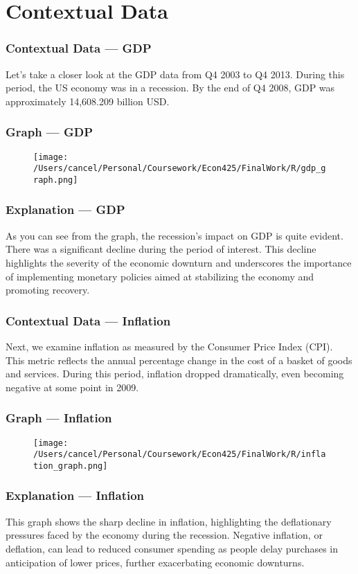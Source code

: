 \documentclass{beamer}
\begin{document}
\section{Contextual Data}
\begin{frame}
    \frametitle{Contextual Data --- GDP}
    Let's take a closer look at the GDP data from Q4 2003 to Q4 2013. During this period, the US economy was in a recession. By the end of Q4 2008, GDP was approximately 14,608.209 billion USD\@.
\end{frame}

\begin{frame}
    \frametitle{Graph --- GDP}
    \begin{figure}[h!]
        \centering
        \texttt{[image: /Users/cancel/Personal/Coursework/Econ425/FinalWork/R/gdp\_graph.png]}
    \end{figure}
\end{frame}

\begin{frame}
    \frametitle{Explanation --- GDP}
    As you can see from the graph, the recession's impact on GDP is quite evident. There was a significant decline during the period of interest. This decline highlights the severity of the economic downturn and underscores the importance of implementing monetary policies aimed at stabilizing the economy and promoting recovery.
\end{frame}

\begin{frame}
    \frametitle{Contextual Data --- Inflation}
    Next, we examine inflation as measured by the Consumer Price Index (CPI). This metric reflects the annual percentage change in the cost of a basket of goods and services. During this period, inflation dropped dramatically, even becoming negative at some point in 2009.
\end{frame}

\begin{frame}
    \frametitle{Graph --- Inflation}
    \begin{figure}[h!]
        \centering
        \texttt{[image: /Users/cancel/Personal/Coursework/Econ425/FinalWork/R/inflation\_graph.png]}
    \end{figure}
\end{frame}

\begin{frame}
    \frametitle{Explanation --- Inflation}
    This graph shows the sharp decline in inflation, highlighting the deflationary pressures faced by the economy during the recession. Negative inflation, or deflation, can lead to reduced consumer spending as people delay purchases in anticipation of lower prices, further exacerbating economic downturns.
\end{frame}
\end{document}
